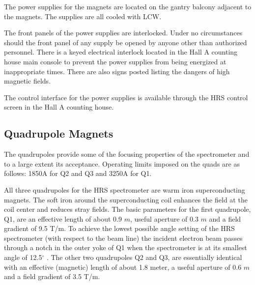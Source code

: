 {The power supplies for the magnets are located on the gantry balcony 
adjacent to the magnets.  The supplies are all cooled with LCW.

\begin{safetyen}{10}{15}

The front panels of the power supplies are interlocked.  Under no 
circumstances should the front panel of any supply be opened by anyone 
other than authorized personnel.  There is a keyed electrical interlock 
located in the Hall A counting house main console to prevent the power 
supplies from being energized at inappropriate times.  There are also 
signs posted listing the dangers of high magnetic fields.
\end{safetyen}

The control interface for the power supplies is available through the 
HRS control screen in the Hall A counting house.

\subsection{Quadrupole Magnets}

The quadrupoles provide some of the 
focusing properties of the spectrometer and to a large extent 
its acceptance.  Operating limits imposed on the 
quads are as follows: 1850A for Q2 and Q3 and 3250A 
for Q1.

All three quadrupoles for the HRS spectrometer are warm iron 
superconducting magnets.  The soft iron around the superconducting coil 
enhances the field at the coil center and reduces stray fields.  The 
basic parameters for the first quadrupole, Q1, are an effective length of about 
0.9 $m$, useful aperture of 0.3 $m$ and a field gradient of 9.5 
T/m.  To achieve the lowest possible angle setting of the HRS 
spectrometer (with respect to the beam line) the incident electron beam passes through
a notch in the outer yoke of Q1 when the spectrometer is at
its smallest angle of 12.5$^\circ$ . The 
other two quadrupoles Q2 and Q3, are essentially identical with an 
effective (magnetic) length of about 1.8 meter, a useful aperture of 
0.6 $m$ and a field gradient of 3.5 T/m.
} %

